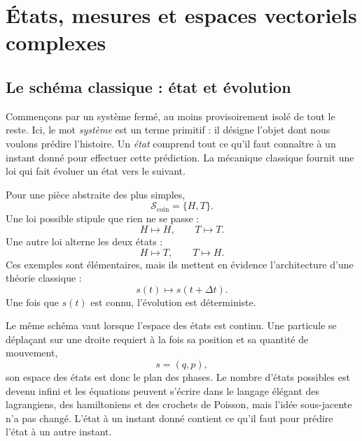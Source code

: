 \chapter{États, mesures et espaces vectoriels complexes}


\section{Le schéma classique : état et évolution}

Commençons par un système fermé, au moins provisoirement isolé de tout le reste. Ici, le mot \emph{système} est un terme primitif : il désigne l’objet dont nous voulons prédire l’histoire. Un \emph{état} comprend tout ce qu’il faut connaître à un instant donné pour effectuer cette prédiction. La mécanique classique fournit une loi qui fait évoluer un état vers le suivant.

Pour une pièce abstraite des plus simples,
\begin{equation}
  \mathcal S_{\mathrm{coin}}=\{H,T\}.
\end{equation}
Une loi possible stipule que rien ne se passe :
\begin{equation}
  H\longmapsto H,
  \qquad
  T\longmapsto T.
\end{equation}
Une autre loi alterne les deux états :
\begin{equation}
  H\longmapsto T,
  \qquad
  T\longmapsto H.
\end{equation}
Ces exemples sont élémentaires, mais ils mettent en évidence l’architecture d’une théorie classique :
\begin{equation}
  s(t)\longmapsto s(t+\Delta t).
\end{equation}
Une fois que \(s(t)\) est connu, l’évolution est déterministe.

Le même schéma vaut lorsque l’espace des états est continu. Une particule se déplaçant sur une droite requiert à la fois sa position et sa quantité de mouvement,
\begin{equation}
  s=(q,p),
\end{equation}
son espace des états est donc le plan des phases. Le nombre d’états possibles est devenu infini et les équations peuvent s’écrire dans le langage élégant des lagrangiens, des hamiltoniens et des crochets de Poisson, mais l’idée sous-jacente n’a pas changé. L’état à un instant donné contient ce qu’il faut pour prédire l’état à un autre instant.

